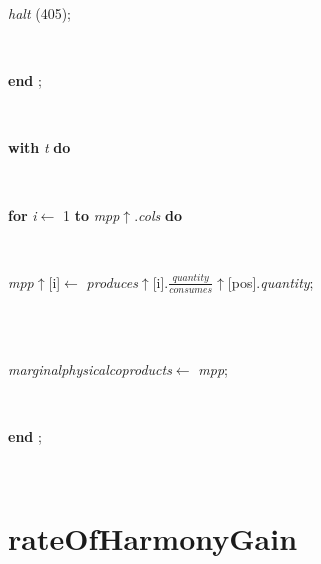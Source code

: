 \begin{tabbing}
\parbox{14cm}{\textsf{\textit{halt} (405)}; }\\
\<\-\parbox{14cm}{\textsf{\textbf{end} ;}}\\
\+\parbox{14cm}{\textsf {\textbf {with } \textsf{\textit{t}} \textbf{ do } }}\\
\+\parbox{14cm}{\textsf {\textbf {for } \textsf{\textit{i}$\leftarrow$ 1} \textbf{ to } \textsf{\textit{mpp}$\uparrow$.\textit{cols}} \textbf{ do } }}\\
\-\-\parbox{14cm}{\textsf{\textit{mpp}$\uparrow$\textit{}[i]$\leftarrow$ \textit{produces}$\uparrow$\textit{}[i].$\frac{\textit{quantity}}{\textit{consumes}}$$\uparrow$\textit{}[pos].\textit{quantity}}; }\\
\\
\parbox{14cm}{\textsf{\textit{marginalphysicalcoproducts}$\leftarrow$ \textit{mpp}}; }\\
\<\-\parbox{14cm}{\textsf{\textbf{end} ;}}\\
\end{tabbing}
\section{rateOfHarmonyGain}\label{sec:technologiesrateOfHarmonyGain}

